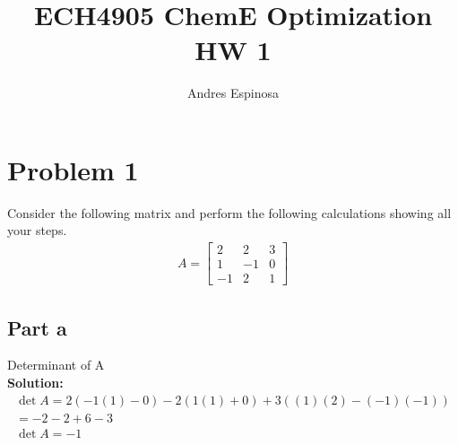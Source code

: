 \documentclass[11pt]{article}
\title{ECH4905 ChemE Optimization HW 1}
\author{Andres Espinosa}
\begin{document}
\maketitle

\section{Problem 1}
Consider the following matrix and perform the following calculations showing all your steps.
\begin{align*}
    A = 
  \begin{bmatrix}
     2 & 2 & 3 \\
     1 & -1 &0 \\
     -1 & 2 &1
  \end{bmatrix}
\end{align*}
\subsection{Part a}
Determinant of A
\\
\textbf{Solution: }
\begin{gather*}
    \det A = 
    2 (-1(1) - 0) - 2(1(1) + 0) + 3((1)(2) - (-1)(-1)) \\
    = -2 -2 + 6 - 3 \\
    \det A = -1
\end{gather*}
\end{document}
